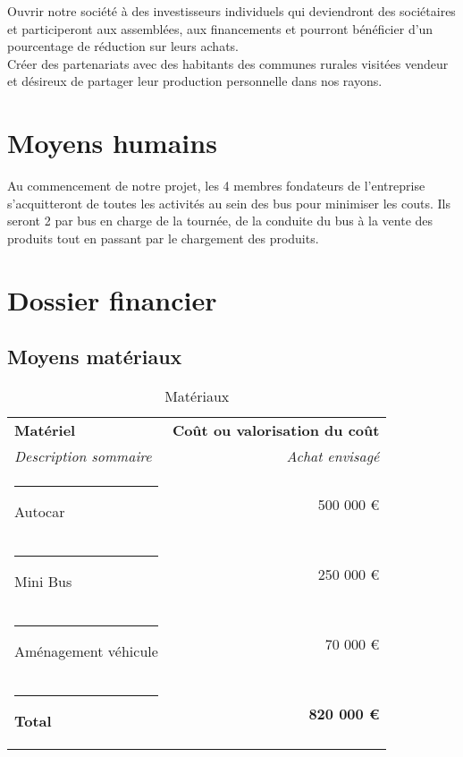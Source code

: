 \documentclass[12pt,a4paper]{report}
\begin{document}
	Ouvrir notre société à des investisseurs individuels qui deviendront des sociétaires et participeront aux assemblées, aux financements et pourront bénéficier d'un pourcentage de réduction sur leurs achats.\\
	
	Créer des partenariats avec des habitants des communes rurales visitées vendeur et désireux de partager leur production personnelle dans nos rayons.

		\chapter{Moyens humains}
		
		Au commencement de notre projet, les 4 membres fondateurs de l’entreprise s’acquitteront de toutes les activités au sein des bus pour minimiser les couts. Ils seront 2 par bus en charge de la tournée, de la conduite du bus à la vente des produits tout en passant par le chargement des produits.\\


		\chapter{Dossier financier}
	\section{Moyens matériaux}
		\begin{table}[h]
		  \centering
		  \caption{\color{green}Matériaux}
		  \vspace{0.5cm}
		    \begin{tabular}{l|r}
		    
		    	\textbf{Matériel} & \textbf{Coût ou valorisation du coût} \\
		 		\textit{Description sommaire} &  \textit{Achat envisagé}  \\ \hline 
		    	\rule[0.5cm]{-0.1cm}{0cm}
		    	Autocar  & 500 000 €   \\
		    	\rule[0.5cm]{-0.1cm}{0cm}
		    	Mini Bus & 250 000 € \\
		    	\rule[0.5cm]{-0.1cm}{0cm}
		    	Aménagement véhicule & 70 000 €\\ \hline
		    	\rule[0.5cm]{-0.1cm}{0cm}
		    	 \textbf{\color{green}Total } &    \textbf{\color{green}820 000 €}  \\
		
		    \end{tabular}
		  \label{tab:addlabel}
		\end{table}
				
\end{document}
